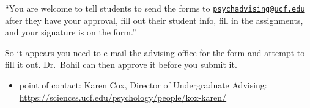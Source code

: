 \documentclass[
]{book}
\providecommand{\tightlist}{%
  \setlength{\itemsep}{0pt}\setlength{\parskip}{0pt}}
\begin{document}
``You are welcome to tell students to send the forms to \href{mailto:psychadvising@ucf.edu}{\nolinkurl{psychadvising@ucf.edu}} after they have your approval, fill out their student info, fill in the assignments, and your signature is on the form.''

So it appears you need to e-mail the advising office for the form and attempt to fill it out. Dr.~Bohil can then approve it before you submit it.

\begin{itemize}
\tightlist
\item
  point of contact: Karen Cox, Director of Undergraduate Advising: \url{https://sciences.ucf.edu/psychology/people/kox-karen/}
\end{itemize}

  
\end{document}
